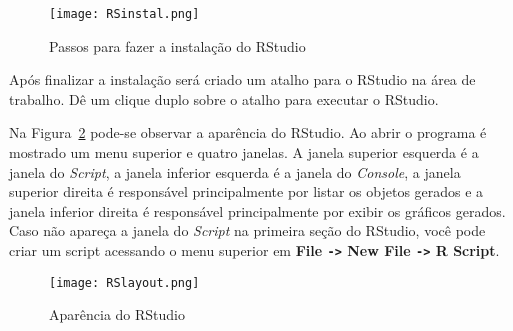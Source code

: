 \documentclass[11pt,fleqn]{book} %
\begin{document}
\begin{figure}[h]
\centering\texttt{[image: RSinstal.png]}
\setlength{\abovecaptionskip}{0.5pt}
\caption{Passos para fazer a instalação do RStudio}
\label{fig:RSinstal} %
\end{figure}






Após finalizar a instalação será criado um atalho para o RStudio na área de trabalho. Dê um clique duplo sobre o atalho para executar o RStudio. 


Na Figura~\ref{fig:RSlayout} pode-se observar a aparência do RStudio. Ao abrir o programa é mostrado um menu superior e quatro janelas. A janela superior esquerda é a janela do {\itshape Script}, a janela inferior esquerda é a janela do {\itshape Console}, a janela superior direita é responsável principalmente por listar os objetos gerados e a janela inferior direita é responsável principalmente por exibir os gráficos gerados. Caso não apareça a janela do {\itshape Script} na primeira seção do RStudio, você pode criar um script acessando o menu superior em {\bf File \texttt{->} New File \texttt{->} R Script}.


\begin{figure}[h]
\centering\texttt{[image: RSlayout.png]}
\setlength{\abovecaptionskip}{0.5pt}
\caption{Aparência do RStudio}
\label{fig:RSlayout} %
\end{figure}



\end{document}
